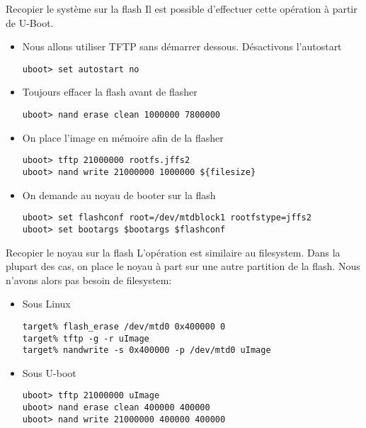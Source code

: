 \begin{frame}[fragile=singleslide]{Recopier le système sur la flash}
  Il est possible d'effectuer cette opération à partir de U-Boot.
  \begin{itemize}
  \item Nous allons utiliser TFTP sans démarrer dessous. Désactivons l'autostart
    \begin{lstlisting}
uboot> set autostart no
    \end{lstlisting}
  \item Toujours effacer la flash avant de flasher
    \begin{lstlisting}
uboot> nand erase clean 1000000 7800000
    \end{lstlisting}
  \item On place l'image en mémoire afin de la flasher
    \begin{lstlisting}
uboot> tftp 21000000 rootfs.jffs2
uboot> nand write 21000000 1000000 ${filesize}
    \end{lstlisting}
  \item On demande au noyau de booter sur la flash
    \begin{lstlisting}
uboot> set flashconf root=/dev/mtdblock1 rootfstype=jffs2
uboot> set bootargs $bootargs $flashconf
    \end{lstlisting}
  \end{itemize}
\end{frame}

\begin{frame}[fragile=singleslide]{Recopier le noyau sur la flash}
  L'opération est similaire au filesystem. Dans la plupart des cas, on
  place le  noyau à  part sur  une autre partition  de la  flash. Nous
  n'avons alors pas besoin de filesystem:
  \begin{itemize}
  \item Sous Linux
    \begin{lstlisting}
target% flash_erase /dev/mtd0 0x400000 0
target% tftp -g -r uImage
target% nandwrite -s 0x400000 -p /dev/mtd0 uImage
    \end{lstlisting}
  \item Sous U-boot
    \begin{lstlisting}
uboot> tftp 21000000 uImage
uboot> nand erase clean 400000 400000
uboot> nand write 21000000 400000 400000
    \end{lstlisting}
  \end{itemize}
\end{frame}

